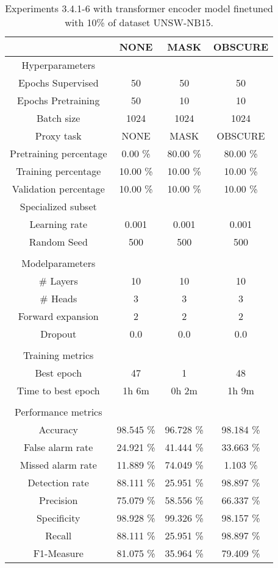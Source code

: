 \begin{table}[htb]
    \centering
    \begin{tabular}{@{}cccc@{}}
        \toprule
         &  NONE &  MASK &  OBSCURE \\
        \midrule
        Hyperparameters &  &  &  \\
        Epochs Supervised &  50 &  50 &  50 \\
        Epochs Pretraining &  50 &  10 &  10 \\
        Batch size &  1024 &  1024 &  1024 \\
        Proxy task &  NONE &  MASK &  OBSCURE \\
        Pretraining percentage &  0.00 \% &  80.00 \% &  80.00 \% \\
        Training percentage &  10.00 \% &  10.00 \% &  10.00 \% \\
        Validation percentage &  10.00 \% &  10.00 \% &  10.00 \% \\
        Specialized subset &   &   &   \\
        Learning rate &  0.001 &  0.001 &  0.001 \\
        Random Seed &  500 &  500 &  500 \\
         \\
        Modelparameters &  &  &  \\
        \# Layers &  10 &  10 &  10 \\
        \# Heads &  3 &  3 &  3 \\
        Forward expansion &  2 &  2 &  2 \\
        Dropout &  0.0 &  0.0 &  0.0 \\
         \\
        Training metrics &  &  &  \\
        Best epoch &  47 &  1 &  48 \\
        Time to best epoch &  1h 6m &  0h 2m &  1h 9m \\
         \\
        Performance metrics &  &  &  \\
        Accuracy &  98.545 \% &  96.728 \% &  98.184 \% \\
        False alarm rate &  24.921 \% &  41.444 \% &  33.663 \% \\
        Missed alarm rate &  11.889 \% &  74.049 \% &  1.103 \% \\
        Detection rate &  88.111 \% &  25.951 \% &  98.897 \% \\
        Precision &  75.079 \% &  58.556 \% &  66.337 \% \\
        Specificity &  98.928 \% &  99.326 \% &  98.157 \% \\
        Recall &  88.111 \% &  25.951 \% &  98.897 \% \\
        F1-Measure &  81.075 \% &  35.964 \% &  79.409 \% \\
        \bottomrule
    \end{tabular}
    \caption{Experiments 3.4.1-6 with transformer encoder model finetuned with 10\% of dataset UNSW-NB15.}
    \label{table:results:lstm:stats_flows15_10}
\end{table}